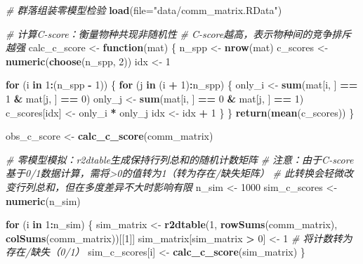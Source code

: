 \documentclass[
  twoside,12pt,fontset=none]{ctexbook}
\newenvironment{Shaded}{\begin{snugshade}}{\end{snugshade}}
\newcommand{\AttributeTok}[1]{\textcolor[rgb]{0.13,0.29,0.53}{#1}}
\newcommand{\CommentTok}[1]{\textcolor[rgb]{0.56,0.35,0.01}{\textit{#1}}}
\newcommand{\ControlFlowTok}[1]{\textcolor[rgb]{0.13,0.29,0.53}{\textbf{#1}}}
\newcommand{\DecValTok}[1]{\textcolor[rgb]{0.00,0.00,0.81}{#1}}
\newcommand{\FunctionTok}[1]{\textcolor[rgb]{0.13,0.29,0.53}{\textbf{#1}}}
\newcommand{\NormalTok}[1]{#1}
\newcommand{\OtherTok}[1]{\textcolor[rgb]{0.56,0.35,0.01}{#1}}
\newcommand{\SpecialCharTok}[1]{\textcolor[rgb]{0.81,0.36,0.00}{\textbf{#1}}}
\newcommand{\StringTok}[1]{\textcolor[rgb]{0.31,0.60,0.02}{#1}}
\begin{document}
\begin{Shaded}
\begin{Highlighting}[]
\CommentTok{\# 群落组装零模型检验}
\FunctionTok{load}\NormalTok{(}\AttributeTok{file=}\StringTok{"data/comm\_matrix.RData"}\NormalTok{)}

\CommentTok{\# 计算C{-}score：衡量物种共现非随机性}
\CommentTok{\# C{-}score越高，表示物种间的竞争排斥越强}
\NormalTok{calc\_c\_score }\OtherTok{\textless{}{-}} \ControlFlowTok{function}\NormalTok{(mat) \{}
\NormalTok{  n\_spp }\OtherTok{\textless{}{-}} \FunctionTok{nrow}\NormalTok{(mat)}
\NormalTok{  c\_scores }\OtherTok{\textless{}{-}} \FunctionTok{numeric}\NormalTok{(}\FunctionTok{choose}\NormalTok{(n\_spp, }\DecValTok{2}\NormalTok{))}
\NormalTok{  idx }\OtherTok{\textless{}{-}} \DecValTok{1}

  \ControlFlowTok{for}\NormalTok{ (i }\ControlFlowTok{in} \DecValTok{1}\SpecialCharTok{:}\NormalTok{(n\_spp }\SpecialCharTok{{-}} \DecValTok{1}\NormalTok{)) \{}
    \ControlFlowTok{for}\NormalTok{ (j }\ControlFlowTok{in}\NormalTok{ (i }\SpecialCharTok{+} \DecValTok{1}\NormalTok{)}\SpecialCharTok{:}\NormalTok{n\_spp) \{}
\NormalTok{      only\_i }\OtherTok{\textless{}{-}} \FunctionTok{sum}\NormalTok{(mat[i, ] }\SpecialCharTok{==} \DecValTok{1} \SpecialCharTok{\&}\NormalTok{ mat[j, ] }\SpecialCharTok{==} \DecValTok{0}\NormalTok{)}
\NormalTok{      only\_j }\OtherTok{\textless{}{-}} \FunctionTok{sum}\NormalTok{(mat[i, ] }\SpecialCharTok{==} \DecValTok{0} \SpecialCharTok{\&}\NormalTok{ mat[j, ] }\SpecialCharTok{==} \DecValTok{1}\NormalTok{)}
\NormalTok{      c\_scores[idx] }\OtherTok{\textless{}{-}}\NormalTok{ only\_i }\SpecialCharTok{*}\NormalTok{ only\_j}
\NormalTok{      idx }\OtherTok{\textless{}{-}}\NormalTok{ idx }\SpecialCharTok{+} \DecValTok{1}
\NormalTok{    \}}
\NormalTok{  \}}
  \FunctionTok{return}\NormalTok{(}\FunctionTok{mean}\NormalTok{(c\_scores))}
\NormalTok{\}}

\NormalTok{obs\_c\_score }\OtherTok{\textless{}{-}} \FunctionTok{calc\_c\_score}\NormalTok{(comm\_matrix)}

\CommentTok{\# 零模型模拟：r2dtable生成保持行列总和的随机计数矩阵}
\CommentTok{\# 注意：由于C{-}score基于0/1数据计算，需将\textgreater{}0的值转为1（转为存在/缺失矩阵）}
\CommentTok{\# 此转换会轻微改变行列总和，但在多度差异不大时影响有限}
\NormalTok{n\_sim }\OtherTok{\textless{}{-}} \DecValTok{1000}
\NormalTok{sim\_c\_scores }\OtherTok{\textless{}{-}} \FunctionTok{numeric}\NormalTok{(n\_sim)}

\ControlFlowTok{for}\NormalTok{ (i }\ControlFlowTok{in} \DecValTok{1}\SpecialCharTok{:}\NormalTok{n\_sim) \{}
\NormalTok{  sim\_matrix }\OtherTok{\textless{}{-}} \FunctionTok{r2dtable}\NormalTok{(}\DecValTok{1}\NormalTok{, }\FunctionTok{rowSums}\NormalTok{(comm\_matrix),}
                         \FunctionTok{colSums}\NormalTok{(comm\_matrix))[[}\DecValTok{1}\NormalTok{]]}
\NormalTok{  sim\_matrix[sim\_matrix }\SpecialCharTok{\textgreater{}} \DecValTok{0}\NormalTok{] }\OtherTok{\textless{}{-}} \DecValTok{1}   \CommentTok{\# 将计数转为存在/缺失（0/1）}
\NormalTok{  sim\_c\_scores[i] }\OtherTok{\textless{}{-}} \FunctionTok{calc\_c\_score}\NormalTok{(sim\_matrix)}
\NormalTok{\}}


\end{Highlighting}
\end{Shaded}
\end{document}
